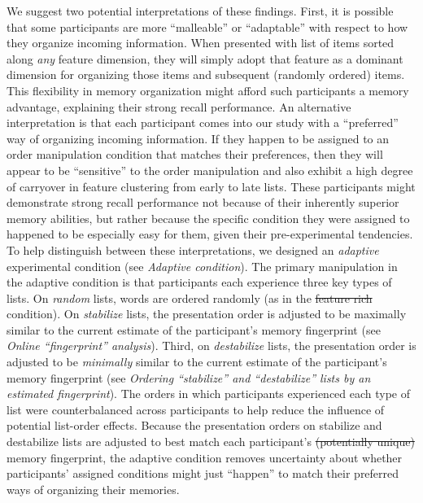 \documentclass[11pt]{article}
\providecommand{\DIFaddtex}[1]{{\protect\color{blue}\uwave{#1}}} %
\providecommand{\DIFdeltex}[1]{{\protect\color{red}\sout{#1}}}                      %
\providecommand{\DIFaddbegin}{} %
\providecommand{\DIFaddend}{} %
\providecommand{\DIFdelbegin}{} %
\providecommand{\DIFdelend}{} %
\providecommand{\DIFadd}[1]{\texorpdfstring{\DIFaddtex{#1}}{#1}} %
\providecommand{\DIFdel}[1]{\texorpdfstring{\DIFdeltex{#1}}{}} %
\newcommand{\DIFscaledelfig}{0.5}
\newlength{\DIFdelgraphicswidth} %
\newlength{\DIFdelgraphicsheight} %
\newcommand{\DIFaddincludegraphics}[2][]{{\color{blue}\fbox{\DIFOincludegraphics[#1]{#2}}}} %
\newcommand{\DIFdelincludegraphics}[2][]{%
\sbox{\DIFdelgraphicsbox}{\DIFOincludegraphics[#1]{#2}}%
\settoboxwidth{\DIFdelgraphicswidth}{\DIFdelgraphicsbox} %
\settoboxtotalheight{\DIFdelgraphicsheight}{\DIFdelgraphicsbox} %
\scalebox{\DIFscaledelfig}{%
\parbox[b]{\DIFdelgraphicswidth}{\usebox{\DIFdelgraphicsbox}\\[-\baselineskip] \rule{\DIFdelgraphicswidth}{0em}}\llap{\resizebox{\DIFdelgraphicswidth}{\DIFdelgraphicsheight}{%
\setlength{\unitlength}{\DIFdelgraphicswidth}%
\begin{picture}(1,1)%
\thicklines\linethickness{2pt} %
{\color[rgb]{1,0,0}\put(0,0){\framebox(1,1){}}}%
{\color[rgb]{1,0,0}\put(0,0){\line( 1,1){1}}}%
{\color[rgb]{1,0,0}\put(0,1){\line(1,-1){1}}}%
\end{picture}%
}\hspace*{3pt}}} %
} %
\DeclareRobustCommand{\DIFaddbegin}{\DIFOaddbegin \let\includegraphics\DIFaddincludegraphics} %
\DeclareRobustCommand{\DIFaddend}{\DIFOaddend \let\includegraphics\DIFOincludegraphics} %
\DeclareRobustCommand{\DIFdelbegin}{\DIFOdelbegin \let\includegraphics\DIFdelincludegraphics} %
\DeclareRobustCommand{\DIFdelend}{\DIFOaddend \let\includegraphics\DIFOincludegraphics} %
\begin{document}
We suggest two potential interpretations of these findings. First, it is
possible that some participants are more ``malleable'' or ``adaptable'' with
respect to how they organize incoming information. When presented with list of
items sorted along \textit{any} feature dimension, they will simply adopt that
feature as a dominant dimension for organizing those items and subsequent
(randomly ordered) items. This flexibility in memory organization might afford
such participants a memory advantage, explaining their strong recall
performance. An alternative interpretation is that each participant comes into
our study with a ``preferred'' way of organizing incoming information. If they
happen to be assigned to an order manipulation condition that matches their
preferences, then they will appear to be ``sensitive'' to the order
manipulation and also exhibit a high degree of carryover in feature clustering
from early to late lists. These participants might demonstrate strong recall
performance not because of their inherently superior memory abilities, but
rather because the specific condition they were assigned to happened to be
especially easy for them, given their pre-experimental tendencies. To help
distinguish between these interpretations, we designed an \textit{adaptive}
experimental condition (see \textit{Adaptive condition}). The primary
manipulation in the adaptive condition is that participants each experience
three key types of lists. On \textit{random} lists, words are ordered randomly
(as in the \DIFdelbegin \DIFdel{feature rich }\DIFdelend \DIFaddbegin \DIFadd{feature-rich }\DIFaddend condition). On \textit{stabilize} lists, the
presentation order is adjusted to be maximally similar to the current estimate
of the participant's memory fingerprint (see \textit{Online “fingerprint”
analysis}). Third, on \textit{destabilize} lists, the presentation order is
adjusted to be \textit{minimally} similar to the current estimate of the
participant's memory fingerprint (see \textit{Ordering ``stabilize'' and
``destabilize'' lists by an estimated fingerprint}). The orders in which
participants experienced each type of list were counterbalanced across
participants to help reduce the influence of potential list-order effects.
Because the presentation orders on stabilize and destabilize lists are adjusted
to best match each participant's \DIFdelbegin \DIFdel{(potentially unique) }\DIFdelend \DIFaddbegin \DIFadd{personal }\DIFaddend memory fingerprint, the adaptive
condition removes uncertainty about whether participants' assigned conditions
might just ``happen'' to match their preferred ways of organizing their
memories.
\end{document}
